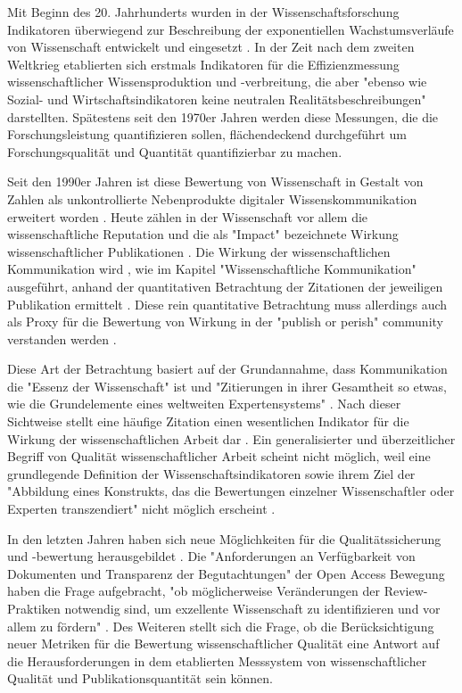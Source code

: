 Mit Beginn des 20. Jahrhunderts wurden in der Wissenschaftsforschung Indikatoren überwiegend zur Beschreibung der exponentiellen Wachstumsverläufe von Wissenschaft entwickelt und eingesetzt \cite{Hornbostel_1997}. In der Zeit nach dem zweiten Weltkrieg etablierten sich erstmals Indikatoren für die Effizienzmessung wissenschaftlicher Wissensproduktion und -verbreitung, die aber "ebenso wie Sozial- und Wirtschaftsindikatoren keine neutralen Realitätsbeschreibungen" \cite{Hornbostel_1997} darstellten. Spätestens seit den 1970er Jahren werden diese Messungen, die die Forschungsleistung quantifizieren sollen, flächendeckend durchgeführt \cite{Hornbostel_1997} um Forschungsqualität und Quantität quantifizierbar zu machen.

Seit den 1990er Jahren ist diese Bewertung von Wissenschaft in Gestalt von Zahlen als unkontrollierte Nebenprodukte digitaler Wissenskommunikation erweitert worden \cite{angermueller_2010}. Heute zählen in der Wissenschaft vor allem die wissenschaftliche Reputation und die als "Impact" bezeichnete Wirkung wissenschaftlicher Publikationen \cite{herb_open_2013} \cite{Hornbostel_1997}. Die Wirkung der wissenschaftlichen Kommunikation wird , wie im Kapitel "Wissenschaftliche Kommunikation" ausgeführt, anhand der quantitativen Betrachtung der Zitationen der jeweiligen Publikation ermittelt \cite{Brembs_2013} \cite[:16]{haustein_2012_multidimensional} \cite{weller2011twitter}. Diese rein quantitative Betrachtung muss allerdings auch als Proxy für die Bewertung von Wirkung in der "publish or perish" community verstanden werden \cite{peters_2015_research}.

Diese Art der Betrachtung basiert auf der Grundannahme, dass Kommunikation die "Essenz der Wissenschaft" \cite{bonitz_1998_matthaus} ist und "Zitierungen in ihrer Gesamtheit so etwas, wie die Grundelemente eines weltweiten Expertensystems" \cite{bonitz_1990_sci}. Nach dieser Sichtweise stellt eine häufige Zitation einen wesentlichen Indikator für die Wirkung der wissenschaftlichen Arbeit dar \cite{hamilton_1990_publishing}. Ein generalisierter und überzeitlicher Begriff von Qualität wissenschaftlicher Arbeit scheint nicht möglich, weil eine grundlegende Definition der Wissenschaftsindikatoren sowie ihrem Ziel der "Abbildung eines Konstrukts, das die Bewertungen einzelner Wissenschaftler oder Experten transzendiert" nicht möglich erscheint \cite{Hornbostel_1997}.

In den letzten Jahren haben sich neue Möglichkeiten für die Qualitätssicherung und -bewertung herausgebildet \cite{rekdal_2014_academic}. Die "Anforderungen an Verfügbarkeit von Dokumenten und Transparenz der Begutachtungen" der Open Access Bewegung haben die Frage aufgebracht, "ob möglicherweise Veränderungen der Review-Praktiken notwendig sind, um exzellente Wissenschaft zu identifizieren und vor allem zu fördern" \cite{suchen_Hornbostel_2006}. Des Weiteren stellt sich die Frage, ob die Berücksichtigung neuer Metriken für die Bewertung wissenschaftlicher Qualität eine Antwort auf die Herausforderungen in dem etablierten Messsystem von wissenschaftlicher Qualität und Publikationsquantität sein können.


